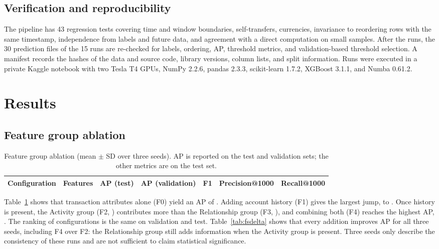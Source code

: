 \documentclass[sigconf,nonacm]{acmart}
\begin{document}
\subsection{Verification and reproducibility}

The pipeline has 43 regression tests covering time and window boundaries, self-transfers, currencies, invariance to
reordering rows with the same timestamp, independence from labels and future data, and agreement with a direct
computation on small samples. After the runs, the 30 prediction files of the 15 runs are re-checked for labels,
ordering, AP, threshold metrics, and validation-based threshold selection. A manifest records the hashes of the data
and source code, library versions, column lists, and split information. Runs were executed in a private Kaggle
notebook with two Tesla T4 GPUs, NumPy 2.2.6, pandas 2.3.3, scikit-learn 1.7.2, XGBoost 3.1.1, and Numba 0.61.2.

\section{Results}

\subsection{Feature group ablation}

\begin{table}[t]
\caption{Feature group ablation (mean $\pm$ SD over three seeds). AP is reported on the test and validation sets;
the other metrics are on the test set.}
\label{tab:features}
\begin{tabular}{lrccccc}
\toprule
Configuration & Features & AP (test) & AP (validation) & F1 & Precision@1000 & Recall@1000 \\
\midrule

\end{tabular}
\end{table}

Table~\ref{tab:features} shows that transaction attributes alone (F0) yield an AP of \FZeroAP. Adding account history
(F1) gives the largest jump, to \FOneAP. Once history is present, the Activity group (F2, \FTwoAP) contributes more
than the Relationship group (F3, \FThreeAP), and combining both (F4) reaches the highest AP, \FFourAP. The ranking of
configurations is the same on validation and test. Table~\ref{tab:fsdelta} shows that every addition improves AP for
all three seeds, including F4 over F2: the Relationship group still adds information when the Activity group is
present. Three seeds only describe the consistency of these runs and are not sufficient to claim statistical
significance.
\end{document}

